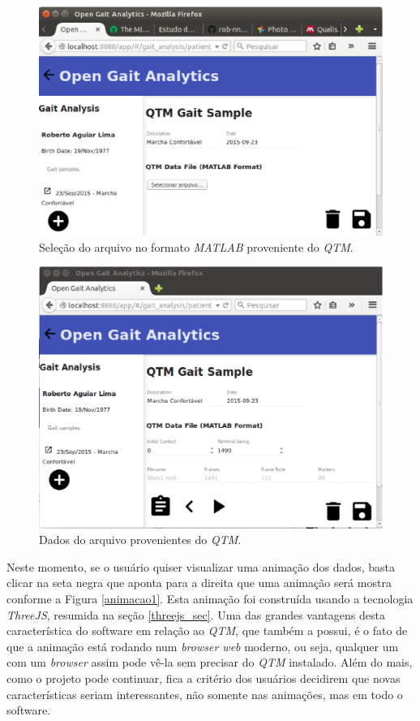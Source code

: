 \begin{figure}[H]
	\centering
	\includegraphics[width=14cm]{figuras/tela6.eps}
	\caption{Seleção do arquivo no formato \emph{MATLAB} proveniente do \emph{QTM}.}
	\label{tela6}
\end{figure}
\begin{figure}[H]
	\centering
	\includegraphics[width=14cm]{figuras/tela7.eps}
	\caption{Dados do arquivo provenientes do \emph{QTM}.}
	\label{tela7}
\end{figure}





Neste momento, se o usuário quiser visualizar uma animação dos dados, basta clicar na seta negra que aponta para a direita que uma animação será mostra conforme a Figura \ref{animacao1}.
Esta animação foi construída usando a tecnologia \emph{ThreeJS}, resumida na seção \ref{threejs_sec}. Uma das grandes vantagens desta característica do software em relação ao \emph{QTM}, que também a possui, é o fato de que a animação está rodando num \emph{browser web} moderno, ou seja, qualquer um com um \emph{browser} assim pode vê-la sem precisar do \emph{QTM} instalado. 
Além do mais, como o projeto pode continuar, fica a critério dos usuários decidirem que novas características seriam interessantes, não somente nas animações, mas em todo o software.


